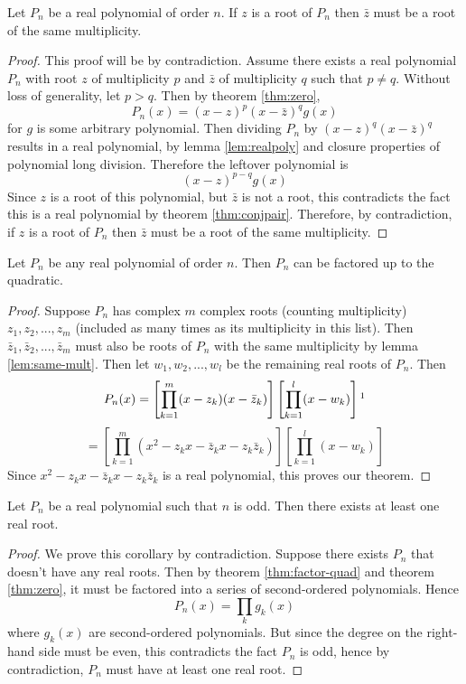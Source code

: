 \documentclass[11pt]{article}
\numberwithin{lemma}{section}
\numberwithin{equation}{section}
\numberwithin{define}{section}
\numberwithin{prop}{section}
\numberwithin{figure}{section}
\numberwithin{theorem}{section}
\numberwithin{cor}{section}
\newcounter{ex}[section]
\numberwithin{ex}{section}
\def\sbrak#1{\left[#1\right]}
\begin{document}
\begin{lemma}
\label{lem:same-mult}
	Let $P_n$ be a real polynomial of order $n$. If $z$ is a root of $P_n$ then $\bar z$ must be a root of the same multiplicity.
\end{lemma}
\begin{proof}
	This proof will be by contradiction. Assume there exists a real polynomial $P_n$ with root $z$ of multiplicity $p$ and $\bar z$ of multiplicity $q$ such that $p\neq q$. 
	Without loss of generality, let $p>q$.
	Then by theorem \eqref{thm:zero},
	$$P_n(x)=(x-z)^p(x-\bar z)^q g(x)$$
	for $g$ is some arbitrary polynomial.
	Then dividing $P_n$ by $(x-z)^q(x-\bar z)^q$ results in a real polynomial, by lemma \eqref{lem:realpoly} and closure properties of polynomial long division.
	Therefore the leftover polynomial is
	$$(x-z)^{p-q} g(x)$$
	Since $z$ is a root of this polynomial, but $\bar z$ is not a root, this contradicts the fact this is a real polynomial by theorem \eqref{thm:conjpair}. Therefore, by contradiction, if $z$ is a root of $P_n$ then $\bar z$ must be a root of the same multiplicity.
\end{proof}
\begin{theorem}
\label{thm:factor-quad}
Let $P_n$ be any real polynomial of order $n$. Then $P_n$ can be factored up to the quadratic.	
\end{theorem}
\begin{proof}
	Suppose $P_n$ has complex $m$ complex roots (counting multiplicity) $z_1,z_2,...,z_m$ (included as many times as its multiplicity in this list). 
	Then $\bar z_1,\bar z_2,...,\bar z_m$ must also be roots of $P_n$ with the same multiplicity by lemma \eqref{lem:same-mult}. Then let $w_1,w_2,...,w_l$ be the remaining real roots of $P_n$. Then
	$$P_n(x)=\sbrak{\prod^m_{k=1}(x-z_k)(x-\bar z_k)}
	\sbrak{\prod^l_{k=1}(x-w_k)}\footnotemark$$
	$$=\sbrak{\prod^m_{k=1}(x^2-z_kx-\bar z_k x-z_k\bar z_k)}
	\sbrak{\prod^l_{k=1}(x-w_k)}$$
	Since $x^2-z_kx-\bar z_k x-z_k\bar z_k$ is a real polynomial, this proves our theorem.
\end{proof}

\begin{cor}
Let $P_n$ be a real polynomial such that $n$ is odd. Then there exists at least one real root.	
\end{cor}
\begin{proof}
	We prove this corollary by contradiction. Suppose there exists $P_n$ that doesn't have any real roots. Then by theorem \eqref{thm:factor-quad} and theorem \eqref{thm:zero}, it must be factored into a series of second-ordered polynomials. Hence
	$$P_n(x)=\prod_k g_k(x)$$
	where $g_k(x)$ are second-ordered polynomials. But since the degree on the right-hand side must be even, this contradicts the fact $P_n$ is odd, hence by contradiction, $P_n$ must have at least one real root. 
\end{proof}
\end{document}
